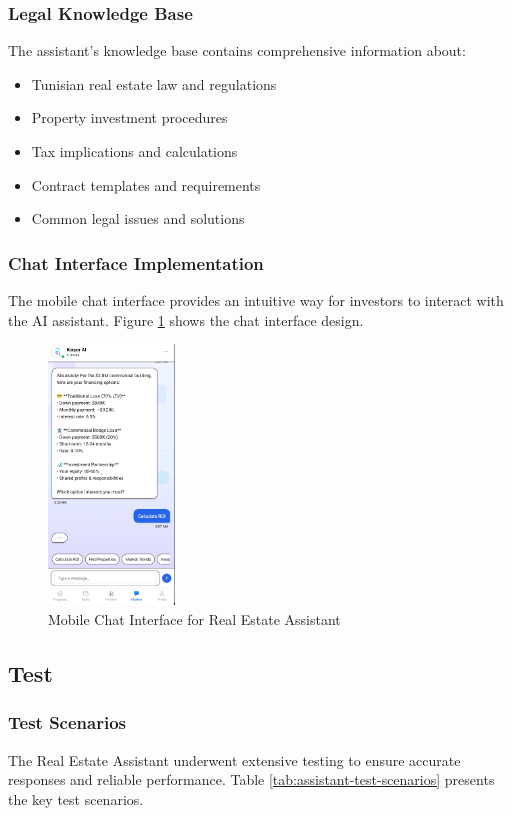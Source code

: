 \subsubsection{Legal Knowledge Base}
The assistant's knowledge base contains comprehensive information about:
\begin{itemize}
    \item Tunisian real estate law and regulations
    \item Property investment procedures
    \item Tax implications and calculations
    \item Contract templates and requirements
    \item Common legal issues and solutions
\end{itemize}

\subsubsection{Chat Interface Implementation}
The mobile chat interface provides an intuitive way for investors to interact with the AI assistant. Figure \ref{fig:assistant-mobile-chat} shows the chat interface design.
\newpage
\begin{figure}[htbp]
    \centering
    \includegraphics[width=0.3\textwidth]{images/assistant_mobile_chat.png}
    \caption{Mobile Chat Interface for Real Estate Assistant}
    \label{fig:assistant-mobile-chat}
\end{figure}


\subsection{Test}
\subsubsection{Test Scenarios}
The Real Estate Assistant underwent extensive testing to ensure accurate responses and reliable performance. Table \ref{tab:assistant-test-scenarios} presents the key test scenarios.

